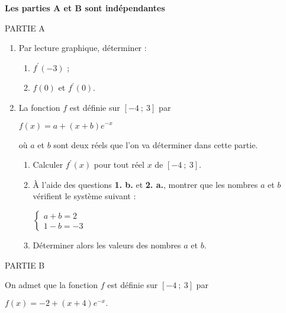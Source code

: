 \textbf{Les parties  A et B sont indépendantes}
\begin{h3}PARTIE A\end{h3}
\begin{enumerate}
     \item
     Par lecture graphique, déterminer :
     \begin{enumerate}[label=\alph*.]
          \item
          $f^\prime(-3)$ ;
          \item
          $f(0)$ et $f^\prime(0)$.
     \end{enumerate}
     \item
     La fonction $f$ est définie sur $[-4~;~3]$ par
     \begin{center}$f(x) = a+(x+b)e^{- x}$\end{center}
     où $a$ et $b$ sont deux réels que l'on va déterminer dans cette partie.
     \begin{enumerate}[label=\alph*.]
          \item
          Calculer $f^\prime(x)$ pour tout réel $x$ de $[-4~;~3]$.
          \item
          À l'aide des questions \textbf{1. b.} et \textbf{2. a.}, montrer que les nombres $a$ et $b$ vérifient le système suivant :
          \begin{center}$\begin{cases} a+b=2 \\ 1-b =-3 \end{cases}$\end{center}
          \item
          Déterminer alors les valeurs des nombres $a$ et $b$.
     \end{enumerate}
\end{enumerate}
\begin{h3}PARTIE B\end{h3}
On admet que la fonction $f$ est définie sur $[-4~;~3]$ par
\begin{center}$f(x) =-2+(x+4)e^{- x}.$\end{center}
